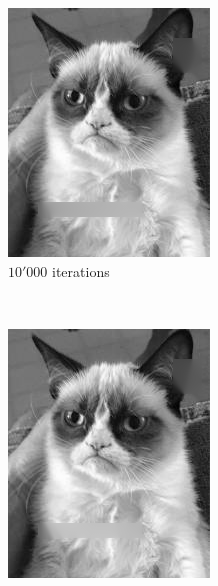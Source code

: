 \documentclass{paper}
\begin{document}
\begin{figure}[ht]
\begin{subfigure}[ht]{0.3\textwidth}
	\includegraphics[width=\textwidth]{cat-iter10000-lambda1000-alpha0_0005}
	\caption*{$10'000$ iterations}
\end{subfigure}
~
\begin{subfigure}[ht]{0.3\textwidth}
	\centering
	\includegraphics[width=\textwidth]{cat-iter50000-lambda1000-alpha0_0005}

\end{subfigure}
\end{figure}
\end{document}
